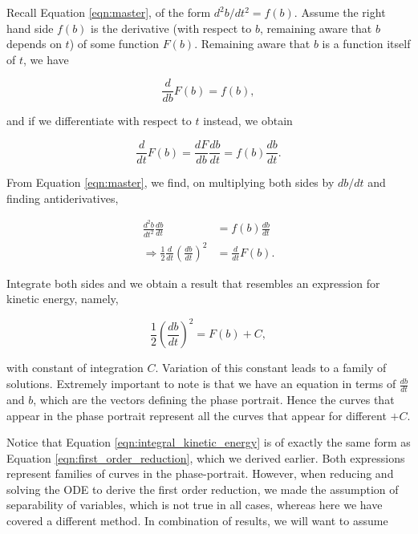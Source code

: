 \documentclass{article}
\begin{document}
Recall Equation \ref{eqn:master}, of the form $d^2b/dt^2 = f(b)$.
Assume the right hand side $f(b)$ is the derivative (with respect to $b$, remaining aware that $b$ depends on $t$) of some function $F(b)$.
Remaining aware that $b$ is a function itself of $t$, we have

\begin{equation}
    \frac{d}{db}F(b) = f(b),
\end{equation}

and if we differentiate with respect to $t$ instead, we obtain

\begin{equation}
    \frac{d}{dt}F(b) = \frac{dF}{db}\frac{db}{dt} = f(b)\frac{db}{dt}.
\end{equation}

From Equation \ref{eqn:master}, we find, on multiplying both sides by $db/dt$ and finding antiderivatives,

\begin{align}
    \frac{d^2b}{dt^2} \frac{db}{dt}                                   & = f(b) \frac{db}{dt} \\
    \Rightarrow \frac{1}{2}\frac{d}{dt}\left( \frac{db}{dt} \right)^2 & = \frac{d}{dt}F(b).
\end{align}

Integrate both sides and we obtain a result that resembles an expression for kinetic energy, namely,

\begin{equation}
    \frac{1}{2}\left(\frac{db}{dt}\right)^2 = F(b) + C,
    \label{eqn:integral_kinetic_energy}
\end{equation}

with constant of integration $C$. Variation of this constant leads to a family of solutions.
Extremely important to note is that we have an equation in terms of $\frac{db}{dt}$ and $b$, which are the vectors defining the phase portrait.
Hence the curves that appear in the phase portrait represent all the curves that appear for different $+C$.


Notice that Equation \ref{eqn:integral_kinetic_energy} is of exactly the same form as Equation \ref{eqn:first_order_reduction},
which we derived earlier.
Both expressions represent families of curves in the phase-portrait.
However, when reducing and solving the ODE to derive the first order reduction, we made the assumption of separability of variables,
which is not true in all cases,
whereas here we have covered a different method.
In combination of results, we will want to assume
\end{document}
